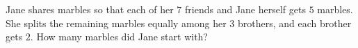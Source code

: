 Jane shares marbles so that each of her $7$ friends and Jane herself gets $5$ marbles. She splits the remaining marbles equally among her $3$ brothers, and each brother gets $2$. How many marbles did Jane start with?
